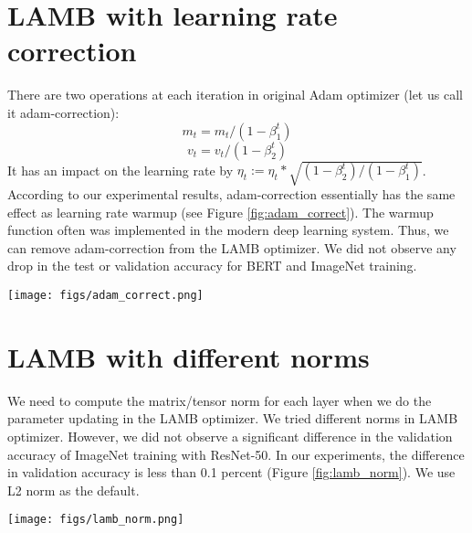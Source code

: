 \documentclass{article} \usepackage{iclr2020_conference,times}
\begin{document}
\section{LAMB with learning rate correction}

There are two operations at each iteration in original Adam optimizer (let us call it adam-correction):
$$m_t = m_t/(1 - {\beta}_1^t)$$
$$v_t = v_t/(1 - {\beta}_2^t)$$
It has an impact on the learning rate by ${\eta}_t := {\eta}_t * \sqrt{(1 - {\beta}_2^t) / (1 - {\beta}_1^t)}$.
According to our experimental results, adam-correction essentially has the same effect as learning rate warmup (see Figure \ref{fig:adam_correct}). The warmup function often was implemented in the modern deep learning system. Thus, we can remove adam-correction from the LAMB optimizer. We did not observe any drop in the test or validation accuracy for BERT and ImageNet training.

\begin{figure*}[tb]
\vspace{5pt}
\centering
\texttt{[image: figs/adam\_correct.png]}
\caption{The figure shows that adam-correction has the same effect as learning rate warmup. We removed adam-correction from the LAMB optimizer. We did not observe any drop in the test or validation accuracy for BERT and ImageNet training.}
\label{fig:adam_correct}
\vspace{-10pt}
\end{figure*}

\section{LAMB with different norms}
We need to compute the matrix/tensor norm for each layer when we do the parameter updating in the LAMB optimizer.
We tried different norms in LAMB optimizer. However, we did not observe a significant difference in the validation accuracy of ImageNet training with ResNet-50. In our experiments, the difference in validation accuracy is less than 0.1 percent (Figure \ref{fig:lamb_norm}). We use L2 norm as the default.

\begin{figure*}[tb]
\vspace{5pt}
\centering
\texttt{[image: figs/lamb\_norm.png]}
\caption{We tried different norms in LAMB optimizer. However, we did not observe a significant difference in the validation accuracy of ImageNet training with ResNet-50. We use L2 norm as the default.}
\label{fig:lamb_norm}
\vspace{-10pt}
\end{figure*}
\end{document}
